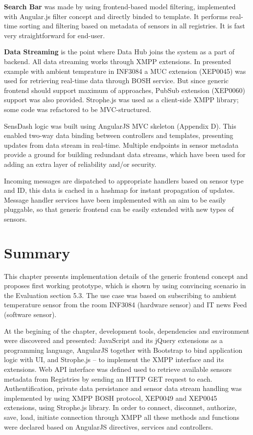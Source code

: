 \textbf{Search Bar} was made by using frontend-based model filtering, implemented with Angular.js filter concept and directly binded to template. It performs real-time sorting and filtering based on metadata of sensors in all registries. It is fast very straightforward for end-user. 

\textbf{Data Streaming} is the point where Data Hub joins the system as a part of backend. All data streaming works through XMPP extensions. In presented example with ambient temprature in INF3084 a MUC extension (XEP0045) was used for retrieving real-time data through BOSH service. But since generic frontend should support maximum of approaches, PubSub extension (XEP0060) support was also provided. Strophe.js was used as a client-side XMPP library; some code was refactored to be MVC-structured.

SensDash logic was built using AngularJS MVC skeleton (Appendix D). This enabled two-way data binding between controllers and templates, presenting updates from data stream in real-time. Multiple endpoints in sensor metadata provide a ground for building redundant data streams, which have been used for adding an extra layer of reliability and/or security. 

Incoming messages are dispatched to appropriate handlers based on sensor type and ID, this data is cached in a hashmap for instant propagation of updates. Message handler services have been implemented with an aim to be easily pluggable, so that generic frontend can be easily extended with new types of sensors.

\section{Summary}
This chapter presents implementation details of the generic frontend concept and proposes first working prototype, which is shown by using convincing scenario in the Evaluation section 5.3. The use case was based on subscribing to ambient temperature sensor from the room INF3084 (hardware sensor) and IT news Feed (software sensor).

At the begining of the chapter, development tools, dependencies and environment were discovered and presented: JavaScript and its jQuery extensions as a programming language, AngularJS together with Bootstrap to bind application logic with UI, and Strophe.js -- to implement the XMPP interface and its extensions. Web API interface was defined used to retrieve available sensors metadata from Registries by sending an HTTP GET request to each. Authentification, private data persistance and sensor data stream handling was implemented by using XMPP BOSH protocol, XEP0049 and XEP0045 extensions, using Strophe.js library. In order to connect, disconnet, authorize, save, load, initiate connection through XMPP all these methods and functions were declared based on AngularJS directives, services and controllers.

